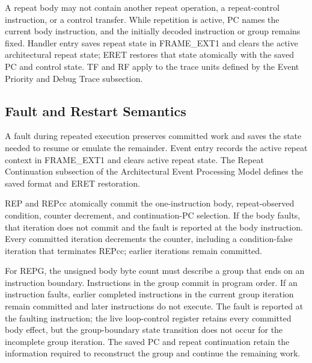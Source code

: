 A repeat body may not contain another repeat operation, a repeat-control instruction, or a control transfer.
While repetition is active, PC names the current body instruction, and the initially decoded instruction or group
remains fixed. Handler entry saves repeat state in FRAME\_EXT1 and clears the active architectural repeat state; ERET
restores that state atomically with the saved PC and control state. TF and RF apply to the trace units defined by the
Event Priority and Debug Trace subsection.

\subsection{Fault and Restart Semantics}
A fault during repeated execution preserves committed work and saves the state needed to resume or emulate the
remainder. Event entry records the active repeat context in FRAME\_EXT1 and clears active repeat state. The Repeat
Continuation subsection of the Architectural Event Processing Model defines the saved format and ERET restoration.

REP and REPcc atomically commit the one-instruction body, repeat-observed condition, counter decrement, and
continuation-PC selection. If the body faults, that iteration does not commit and the fault is reported at the body
instruction. Every committed iteration decrements the counter, including a condition-false iteration that terminates
REPcc; earlier iterations remain committed.

For REPG, the unsigned body byte count must describe a group that ends on an instruction boundary. Instructions in
the group commit in program order. If an instruction faults, earlier completed instructions in the current group
iteration remain committed and later instructions do not execute. The fault is reported at the faulting instruction;
the live loop-control register retains every committed body effect, but the group-boundary state transition does not
occur for the incomplete group iteration. The saved PC and repeat continuation retain the information required to
reconstruct the group and continue the remaining work.
